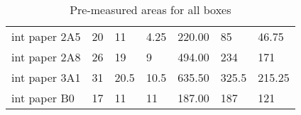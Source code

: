 \documentclass[11pt, twoside, reqno]{book}
\begin{document}
\begin{table}[]
\begin{tabular}{lllllll}
		int paper 2A5       & 20     & 11    & 4.25   & 220.00           & 85               & 46.75            \\
		int paper 2A8       & 26     & 19    & 9      & 494.00           & 234              & 171              \\
		int paper 3A1       & 31     & 20.5  & 10.5   & 635.50           & 325.5            & 215.25           \\
		int paper B0        & 17     & 11    & 11     & 187.00           & 187              & 121             
	\end{tabular}
\caption{Pre-measured areas for all boxes}
\end{table}

\FloatBarrier

\begin{table}[]
	\centering


\end{table}
\end{document}
